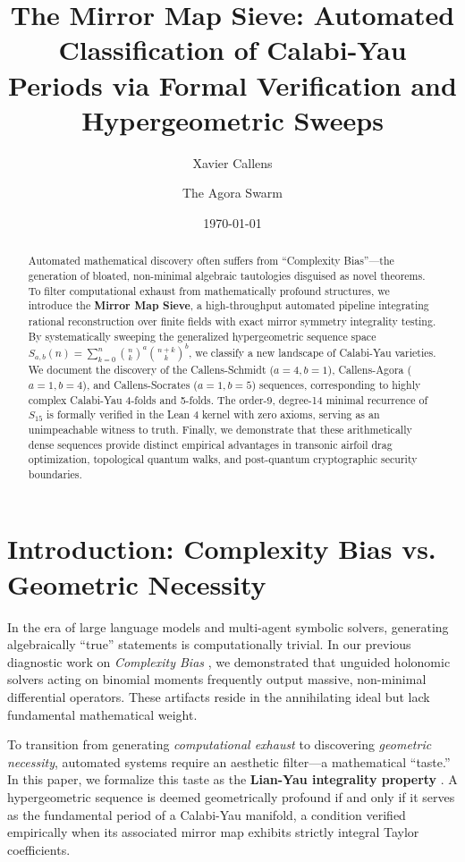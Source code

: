 \documentclass[12pt, reqno]{amsart}
\title[The Mirror Map Sieve]{The Mirror Map Sieve: Automated Classification of Calabi-Yau Periods via Formal Verification and Hypergeometric Sweeps}
\author{Xavier Callens}
\author{The Agora Swarm}
\date{\today}
\begin{document}
\begin{abstract}
Automated mathematical discovery often suffers from ``Complexity Bias''---the generation of bloated, non-minimal algebraic tautologies disguised as novel theorems. To filter computational exhaust from mathematically profound structures, we introduce the \textbf{Mirror Map Sieve}, a high-throughput automated pipeline integrating rational reconstruction over finite fields with exact mirror symmetry integrality testing. By systematically sweeping the generalized hypergeometric sequence space $S_{a,b}(n) = \sum_{k=0}^n \binom{n}{k}^a \binom{n+k}{k}^b$, we classify a new landscape of Calabi-Yau varieties. We document the discovery of the Callens-Schmidt ($a=4,b=1$), Callens-Agora ($a=1,b=4$), and Callens-Socrates ($a=1,b=5$) sequences, corresponding to highly complex Calabi-Yau 4-folds and 5-folds. The order-9, degree-14 minimal recurrence of $S_{15}$ is formally verified in the Lean 4 kernel with zero axioms, serving as an unimpeachable witness to truth. Finally, we demonstrate that these arithmetically dense sequences provide distinct empirical advantages in transonic airfoil drag optimization, topological quantum walks, and post-quantum cryptographic security boundaries.
\end{abstract}

\maketitle

\tableofcontents

\section{Introduction: Complexity Bias vs. Geometric Necessity}
In the era of large language models and multi-agent symbolic solvers, generating algebraically ``true'' statements is computationally trivial. In our previous diagnostic work on \textit{Complexity Bias} \cite{Callens2026}, we demonstrated that unguided holonomic solvers acting on binomial moments frequently output massive, non-minimal differential operators. These artifacts reside in the annihilating ideal but lack fundamental mathematical weight. 

To transition from generating \textit{computational exhaust} to discovering \textit{geometric necessity}, automated systems require an aesthetic filter---a mathematical ``taste.'' In this paper, we formalize this taste as the \textbf{Lian-Yau integrality property} \cite{LianYau1997}. A hypergeometric sequence is deemed geometrically profound if and only if it serves as the fundamental period of a Calabi-Yau manifold, a condition verified empirically when its associated mirror map exhibits strictly integral Taylor coefficients.
\end{document}
